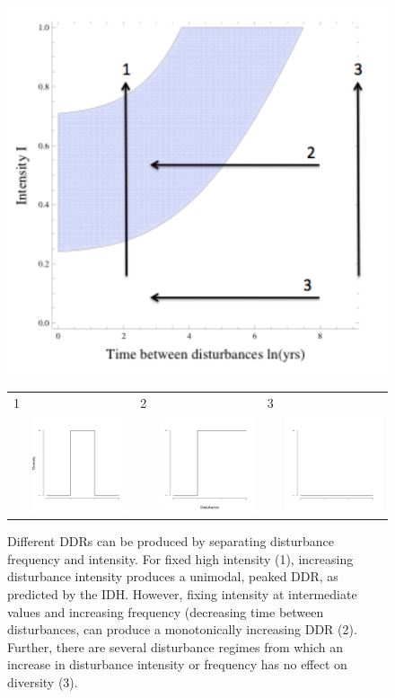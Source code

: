 \documentclass[a4paper]{article}
\begin{document}
\begin{figure}
  \includegraphics[width=5in]{difDDRs.pdf}
  \begin{tabular}{cccccc}
  1&&2&&3& \\
  &\includegraphics[width=1.5in]{ddr1.pdf}&&\includegraphics[width=1.5in]{ddr2.pdf}&&\includegraphics[width=1.5in]{ddr3.pdf}
  \end{tabular}
   \caption{Different DDRs can be produced by separating disturbance frequency and intensity. For fixed high intensity (1), increasing disturbance intensity produces a unimodal, peaked DDR, as predicted by the IDH. However, fixing intensity at intermediate values and increasing frequency (decreasing time between disturbances, can produce a monotonically increasing DDR (2). Further, there are several disturbance regimes from which an increase in disturbance intensity or frequency has no effect on diversity (3).}
 \label{fig:hockeyTd}
\end{figure}
\end{document}
